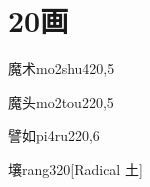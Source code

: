 
\section*{20画}

\begin{verbete}{魔术}{mo2shu4}{20,5}
\end{verbete}

\begin{verbete}{魔头}{mo2tou2}{20,5}
\end{verbete}

\begin{verbete}{譬如}{pi4ru2}{20,6}
\end{verbete}

\begin{verbete}{壤}{rang3}{20}[Radical 土]
\end{verbete}


